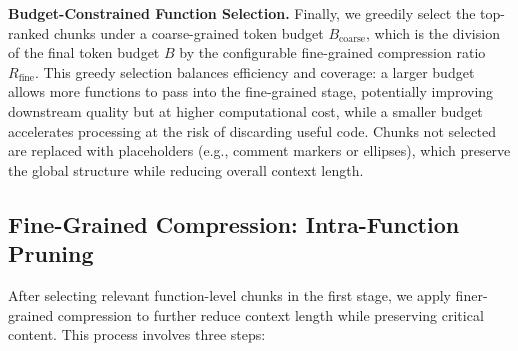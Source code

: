 \documentclass[10pt,conference]{IEEEtran}
\newcommand{\todo}[1]{{\textcolor{cyan}{\textbf{[TODO: #1]}}}}
\begin{document}
\noindent\textbf{Budget-Constrained Function Selection.}
Finally, we greedily select the top-ranked chunks under a coarse-grained token budget $B_{\text{coarse}}$, which is the division of the final token budget $B$ by the configurable fine-grained compression ratio $R_{\text{fine}}$. This greedy selection balances efficiency and coverage: a larger budget allows more functions to pass into the fine-grained stage, potentially improving downstream quality but at higher computational cost, while a smaller budget accelerates processing at the risk of discarding useful code. 
Chunks not selected are replaced with placeholders (e.g., comment markers or ellipses), which preserve the global structure while reducing overall context length.


\subsection{Fine-Grained Compression: Intra-Function Pruning}
\label{ss:method:finegrained}

After selecting relevant function-level chunks in the first stage, we apply finer-grained compression to further reduce context length while preserving critical content. This process involves three steps:
\end{document}
